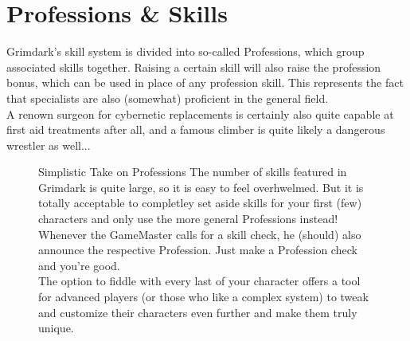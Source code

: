 \chapter{Professions \& Skills}
Grimdark's skill system is divided into so-called Professions, which group associated skills together. Raising a certain skill will also raise the profession bonus, which can be used in place of any profession skill. 
This represents the fact that specialists are also (somewhat) proficient in the general field.\\
A renown surgeon for cybernetic replacements is certainly also quite capable at first aid treatments after all, and a famous climber is quite likely a dangerous wrestler as well...
\begin{figure}[ht]
	\begin{DndSidebar}{Simplistic Take on Professions}
	The number of skills featured in Grimdark is quite large, so it is easy to feel overhwelmed.
	But it is totally acceptable to completley set aside skills for your first (few) characters and only use the more general Professions instead!\\
	Whenever the GameMaster calls for a skill check, he (should) also announce the respective Profession.
	Just make a Profession check and you're good.\\
	The option to fiddle with every last of your character offers a tool for advanced players (or those who like a complex system) to tweak and customize their characters even further and make them truly unique.
	\end{DndSidebar}
\end{figure}

